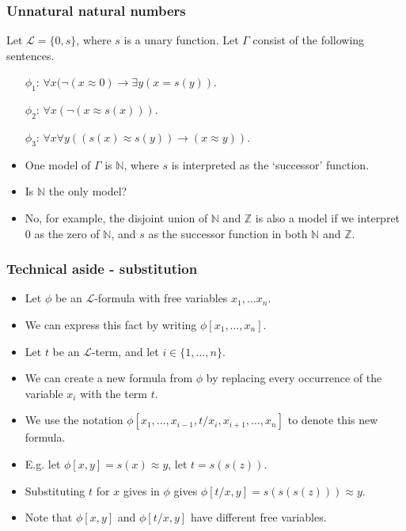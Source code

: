 \documentclass[handout]{beamer}
\newcommand{\sL}{\mathscr{L}}
\newcommand{\bN}{\mathbb{N}}
\newcommand{\bZ}{\mathbb{Z}}
\begin{document}
\begin{frame}
\frametitle{Unnatural natural numbers}
\begin{example}\label{E:nums}
Let $\sL=\{0,s\}$, where $s$ is a unary function. Let $\Gamma$ consist of the following sentences.
\begin{itemize}
\item[$\phi_1$:] $\forall x (\neg (x\approx 0)\rightarrow \exists y (x= s(y))$.
\item[$\phi_2$:] $\forall x (\neg (x\approx s(x)))$. 
\item[$\phi_3$:] $\forall x\forall y ((s(x)\approx s(y))\rightarrow (x\approx y))$. 
\end{itemize}
\vspace{0.3cm}
\begin{itemize}
\item One model of $\Gamma$ is $\bN$, where $s$ is interpreted as the `successor' function. 
\item Is $\bN$ the only model? 
\item No, for example, the disjoint union of $\bN$ and $\bZ$ is also a model if we interpret $0$ as the zero of $\bN$, and $s$ as the successor function in both $\bN$ and $\bZ$. 
\end{itemize}
\end{example}
\end{frame}

\begin{frame}
\frametitle{Technical aside - substitution}
\begin{itemize}
\item Let $\phi$ be an $\sL$-formula with free variables $x_1,\ldots x_n$.
\vspace{0.2cm}
\item We can express this fact by writing $\phi[x_1,\ldots,x_n]$.
\vspace{0.2cm}
\item Let $t$ be an $\sL$-term, and let $i\in \{1,\ldots,n\}$.
\vspace{0.2cm}
\item We can create a new formula from $\phi$ by replacing every occurrence of the variable $x_i$ with the term $t$.
\vspace{0.2cm}
\item We use the notation $\phi[x_1,\ldots,x_{i-1},t/x_i,x_{i+1},\ldots,x_n]$ to denote this new formula.
\vspace{0.2cm}
\item E.g. let $\phi[x,y] = s(x)\approx y$, let $t = s(s(z))$.
\vspace{0.2cm}
\item Substituting $t$ for $x$ gives in $\phi$ gives $\phi[t/x,y]=s(s(s(z)))\approx y$.
\vspace{0.2cm}
\item Note that $\phi[x,y]$ and $\phi[t/x,y]$ have different free variables.
\end{itemize}
\end{frame}
\end{document}
